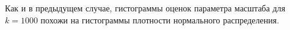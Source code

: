 \documentclass[14pt, a4paper, russian]{report}
\begin{document}


Как и в предыдущем случае, гистограммы оценок параметра масштаба для $k = 1000$ похожи на гистограммы плотности нормального распределения.

\newpage

\end{document}
